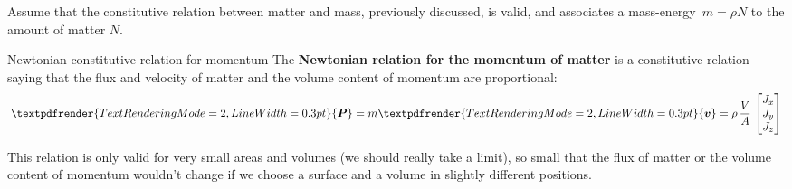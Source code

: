 \documentclass[a4paper,12pt,%
onecolumn,oneside,titlepage,%
british%
]{memoir}
\renewcommand*{\bm}[1]{\textpdfrender{TextRenderingMode=2,LineWidth=0.3pt}{\boldsymbol{#1}}}
\renewcommand*{\|}[1][]{\nonscript\:#1\vert\nonscript\:\mathopen{}}
\newcommand*{\yv}{\bm{v}}
\newcommand*{\yN}{N}
\newcommand*{\yrho}{\rho}
\newcommand*{\yM}{m}%
\newcommand*{\yP}{\bm{P}}
\newcommand*{\masse}{mass-energy}
\begin{document}
Assume that the constitutive relation between matter and mass, previously discussed, is valid, and associates a \masse\ $\yM=\yrho\yN$ to the amount of matter $\yN$.

%
\begin{definition}{Newtonian constitutive relation for momentum}
The \textbf{Newtonian relation for the momentum of matter} is a constitutive relation saying that the flux and velocity of matter and the volume content of momentum are proportional:
  \begin{equation}
    \label{neq:matter_momentum_Newton}
    \yP = \yM\yv = \yrho\, \frac{V}{A}\,
  \begin{bmatrix}
    J_{x}\\J_{y}\\J_{z}
  \end{bmatrix}
  \end{equation}
\end{definition}
This relation is only valid for very small areas and volumes (we should really take a limit), so small that the flux of matter or the volume content of momentum wouldn't change if we choose a surface and a volume in slightly different positions.
\end{document}
